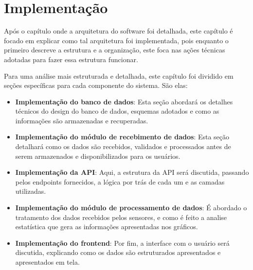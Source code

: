 \chapter{Implementação}\label{cap:implementation}



Após o capítulo onde a arquitetura do software foi detalhada, este capítulo é focado em explicar como tal arquitetura foi implementada, pois enquanto o primeiro descreve a estrutura e a organização, este foca nas ações técnicas adotadas para fazer essa estrutura funcionar.

Para uma análise mais estruturada e detalhada, este capítulo foi dividido em seções específicas para cada componente do sistema. São elas:

\begin{itemize}
    \item \textbf{Implementação do banco de dados}: Esta seção abordará os detalhes técnicos do design do banco de dados, esquemas adotados e como as informações são armazenadas e recuperadas.
    
    \item \textbf{Implementação do módulo de recebimento de dados}: Esta seção detalhará como os dados são recebidos, validados e processados antes de serem armazenados e disponibilizados para os usuários.
    
    \item \textbf{Implementação da API}: Aqui, a estrutura da API será discutida, passando pelos endpoints fornecidos, a lógica por trás de cada um e as camadas utilizadas.
    
    \item \textbf{Implementação do módulo de processamento de dados}: É abordado o tratamento dos dados recebidos pelos sensores, e como é feito a analise estatística que gera as informações apresentadas nos gráficos.
    
    \item \textbf{Implementação do frontend}: Por fim, a interface com o usuário será discutida, explicando como os dados são estruturados apresentados e apresentados em tela.
\end{itemize}










